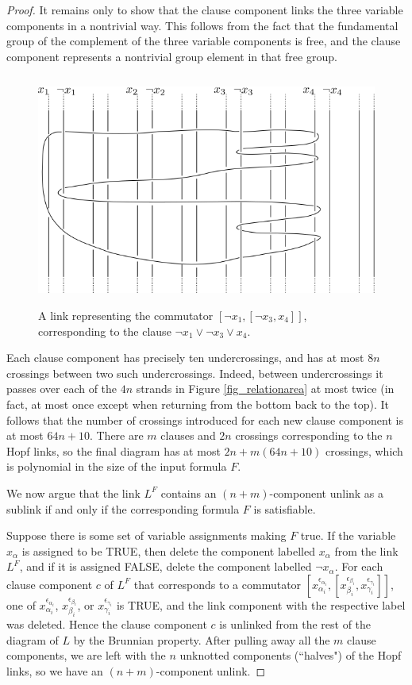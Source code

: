 \documentclass[12pt]{amsart}
\theoremstyle{definition}
\theoremstyle{remark}
\begin{document}
\begin{proof}
It remains only to show that the clause component links the three variable components in a nontrivial way.
This follows from the fact that the fundamental group of the complement of the three variable components is free, and the clause component represents a nontrivial group element in that free group.

\begin{figure}[ht]
\centering
\includegraphics[height=3in]{satclauseexample.png}
\caption{A link representing the commutator $[\neg x_1,[\neg x_3,x_4]]$, corresponding to the clause $ \neg x_1 \vee \neg x_3 \vee x_4$.}
\label{fig_clauselink}
\end{figure}


Each clause component has precisely ten undercrossings, and has at most $8n$ crossings between two such undercrossings.
Indeed, between undercrossings it passes over each of the $4n$ strands in Figure \ref{fig_relationarea}  at most twice (in fact, at most once except when returning from the bottom back to the top).
It follows that the number of crossings introduced for each new clause component is at most $64n + 10$.
There are $m$ clauses and $2n$ crossings corresponding to the $n$ Hopf links, so the final diagram has at most $2n+m(64n+10)$ crossings, which is polynomial in the size of the input formula $F$.

We now argue that the link $L^F$ contains an $(n+m)$-component unlink as a sublink if and only if the corresponding formula $F$ is satisfiable.


Suppose there is some set of variable assignments making $F$ true.
If the variable $x_\alpha$ is assigned to be TRUE, then delete the component labelled $x_\alpha$ from the link $L^F$, and if it is assigned FALSE, delete the component labelled $\neg x_\alpha$.
For each clause component $c$ of $L^F$ that corresponds to a commutator $[x_{\alpha_i}^{\epsilon_{\alpha_i}}, [ x_{\beta_i}^{\epsilon_{\beta_i}}, x_{\gamma_i}^{\epsilon_{\gamma_i}}]]$, one of $x_{\alpha_i}^{\epsilon_{\alpha_i}}$, $x_{\beta_i}^{\epsilon_{\beta_i}}$, or $x_{\gamma_i}^{\epsilon_{\gamma_i}}$ is TRUE, and the link component with the respective label was deleted.
Hence the clause component $c$ is unlinked from the rest of the diagram of $L$ by the Brunnian property.
After pulling away all the $m$ clause components, we are left with the $n$ unknotted components (``halves") of the Hopf links, so we have an $(n+m)$-component unlink.


\end{proof}
\end{document}
